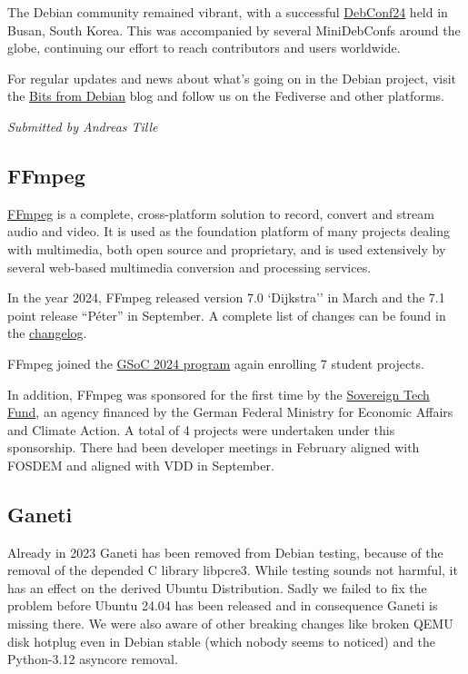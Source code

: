 \documentclass[a4paper]{report}
\begin{document}
The Debian community remained vibrant, with a successful \href{https://debconf24.debconf.org/}{DebConf24} held in Busan, South Korea. This was accompanied by several MiniDebConfs around the globe, continuing our effort to reach contributors and users worldwide.

For regular updates and news about what’s going on in the Debian project, visit the \href{https://bits.debian.org/}{Bits from Debian} blog and follow us on the Fediverse and other platforms.

{\em Submitted by Andreas Tille}

\subsection{FFmpeg}

\href{https://www.ffmpeg.org}{FFmpeg} is a complete, cross-platform solution to record, convert and stream audio and video. It is used as the foundation platform of many projects dealing with multimedia, both open source and proprietary, and is used extensively by several web-based multimedia conversion and processing services.

In the year 2024, FFmpeg released version 7.0 `Dijkstra'' in March and the 7.1 point release ``Péter'' in September. A complete list of changes can be found in the \href{https://git.ffmpeg.org/gitweb/ffmpeg.git/blob/HEAD:/Changelog}{changelog}.

FFmpeg joined the \href{https://summerofcode.withgoogle.com/programs/2024/organizations/ffmpeg}{GSoC 2024 program} again enrolling 7 student projects.

In addition, FFmpeg was sponsored for the first time by the \href{https://www.sovereign.tech/tech/ffmpeg}{Sovereign Tech Fund}, an agency financed by the German Federal Ministry for Economic Affairs and Climate Action. A total of 4 projects were undertaken under this sponsorship. There had been developer meetings in February aligned with FOSDEM and aligned with VDD in September.

\subsection{Ganeti}

Already in 2023 Ganeti has been removed from Debian testing, because of the removal of the depended C library libpcre3. While testing sounds not harmful, it has an effect on the derived Ubuntu Distribution. Sadly we failed to fix the problem before Ubuntu 24.04 has been released and in consequence Ganeti is missing there. We were also aware of other breaking changes like broken QEMU disk hotplug even in Debian stable (which nobody seems to noticed) and the Python-3.12 asyncore removal.
\end{document}
